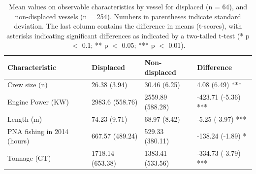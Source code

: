 \documentclass[12pt]{article}
\begin{document}
\begin{table}[H]
\caption{\label{tab:balance_table}Mean values on observable characteristics by vessel for displaced (n = 64), and non-displaced vessels (n = 254). Numbers in parentheses indicate standard deviation. The last column contains the difference in means (t-scores), with asterisks indicating significant differences as indicated by a two-tailed t-test (* p $<$ 0.1; ** p $<$ 0.05; *** p $<$ 0.01).}
\centering
\begin{tabular}{l|l|l|l}
\hline
Characteristic & Displaced & Non-displaced & Difference\\
\hline
Crew size (n) & 26.38 (3.94) & 30.46 (6.25) & 4.08 (6.49) ***\\
\hline
Engine Power (KW) & 2983.6 (558.76) & 2559.89 (588.28) & -423.71 (-5.36) ***\\
\hline
Length (m) & 74.23 (9.71) & 68.97 (8.42) & -5.25 (-3.97) ***\\
\hline
PNA fishing in 2014 (hours) & 667.57 (489.24) & 529.33 (380.11) & -138.24 (-1.89) *\\
\hline
Tonnage (GT) & 1718.14 (653.38) & 1383.41 (533.56) & -334.73 (-3.79) ***\\
\hline
\end{tabular}
\end{table}
\end{document}
